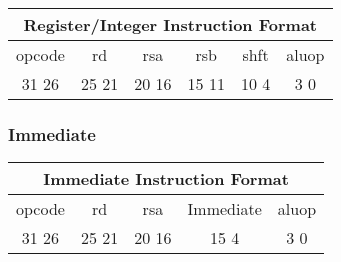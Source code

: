 \documentclass[letterpaper, 11pt]{article}
\begin{document}
\begin{center}
		\begin{tabular}{|c|c|c|c|c|c|}
			\multicolumn{6}{c}{Register/Integer Instruction Format}\\ \hline
				\hspace{2pt} opcode \hspace{2pt} & \hspace{5pt} rd \hspace{5pt} &  \hspace{4pt} rsa \hspace{4pt} & \hspace{4pt}rsb  \hspace{4pt}& \hspace{10pt}shft  \hspace{10pt} & \hspace{3pt} aluop \hspace{3pt}   \\	\hline
			31 \hfill 26& 25 \hfill 21 &20 \hfill  16& 15 \hfill  11&10 \hfill   4&3 \hfill   0\\ \hline
		
	\end{tabular}
\end{center}	




\subsubsection{Immediate}

\begin{center}
		\begin{tabular}{|c|c|c|c|c|}
			\multicolumn{5}{c}{Immediate Instruction Format}\\ \hline
				\hspace{2pt} opcode \hspace{2pt} & \hspace{5pt} rd \hspace{5pt} &  \hspace{4pt} rsa \hspace{4pt} & \hspace{10pt}Immediate  \hspace{10pt} & \hspace{3pt} aluop \hspace{3pt}   \\	\hline
			31 \hfill 26& 25 \hfill 21 &20 \hfill  16& 15  \hfill   4&3 \hfill   0\\ \hline
		
	\end{tabular}
\end{center}
\end{document}
